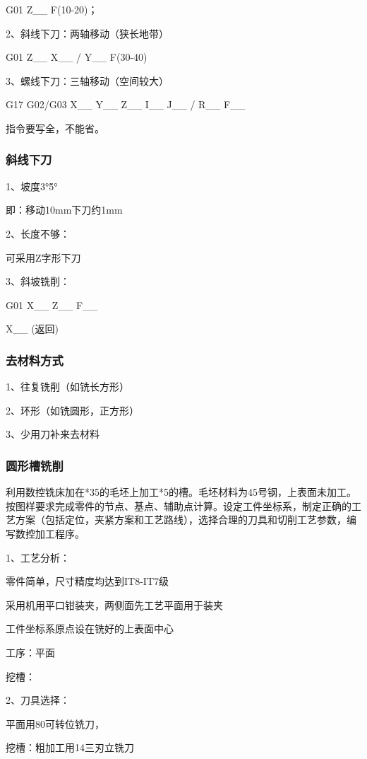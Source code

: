G01 Z\_\_ F(10-20)；

2、斜线下刀：两轴移动（狭长地带）

G01 Z\_\_ X\_\_ / Y\_\_ F(30-40)

3、螺线下刀：三轴移动（空间较大）

G17 G02/G03 X\_\_ Y\_\_ Z\_\_ I\_\_ J\_\_ / R\_\_ F\_\_

指令要写全，不能省。

\subsubsection{斜线下刀}

1、坡度3°\~ 5°

即：移动10mm下刀约1mm

2、长度不够：

可采用Z字形下刀

3、斜坡铣削：

G01 X\_\_ Z\_\_ F\_\_

X\_\_  (返回)

\subsubsection{去材料方式}

1、往复铣削（如铣长方形）

2、环形（如铣圆形，正方形）

3、少用刀补来去材料

\subsubsection{圆形槽铣削}

利用数控铣床加在*35的毛坯上加工*5的槽。毛坯材料为45号钢，上表面未加工。按图样要求完成零件的节点、基点、辅助点计算。设定工件坐标系，制定正确的工艺方案（包括定位，夹紧方案和工艺路线），选择合理的刀具和切削工艺参数，编写数控加工程序。

1、工艺分析：

零件简单，尺寸精度均达到IT8-IT7级

采用机用平口钳装夹，两侧面先工艺平面用于装夹

工件坐标系原点设在铣好的上表面中心

工序：平面

挖槽：

2、刀具选择：

平面用\diameter 80可转位铣刀，

挖槽：粗加工用\diameter 14三刃立铣刀

